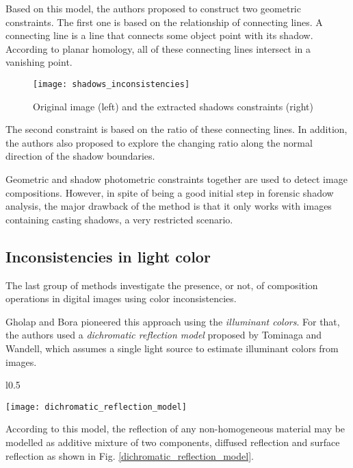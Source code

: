 Based on this model, the authors proposed to construct two geometric constraints. The first one is based on the relationship of connecting lines. A connecting line is a line that connects some object point with its shadow. According to planar homology, all of these connecting lines intersect in a vanishing point. 

\begin{figure}
  \centering
    \texttt{[image: shadows\_inconsistencies]}
    \caption{Original image (left) and the extracted shadows constraints (right)}
    \label{shadows_inconsistencies}
\end{figure}

The second constraint is based on the ratio of these connecting lines. In addition, the authors also proposed to explore the changing ratio along the normal direction of the shadow boundaries. 

Geometric and shadow photometric constraints together are used to detect image compositions. However, in spite of being a good initial step in forensic shadow analysis, the major drawback of the method is that it only works with images containing casting shadows, a very restricted scenario.

\subsection{Inconsistencies in light color}

The last group of methods investigate the presence, or not, of composition operations in digital images using color inconsistencies.

Gholap and Bora\cite{gholap2008illuminant}\cite{francis2014illuminant} pioneered this approach using the \emph{illuminant colors}. For that, the authors used a \emph{dichromatic reflection model} proposed by Tominaga and Wandell\cite{tominaga1989standard}, which assumes a single light source to estimate illuminant colors from images.

\begin{wrapfigure}{l}{0.5\textwidth}
  \begin{center}
    \texttt{[image: dichromatic\_reflection\_model]}
  \end{center}
  \label{dichromatic_reflection_model}
  \caption{The dichromatic reflection model}
\end{wrapfigure}


According to this model, the reflection of any non-homogeneous material may be modelled as additive mixture of two components, diffused reflection and surface reflection as shown in Fig. \ref{dichromatic_reflection_model}.

